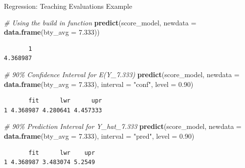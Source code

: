 \documentclass[
  ignorenonframetext,
]{beamer}
\newenvironment{Shaded}{\begin{snugshade}}{\end{snugshade}}
\newcommand{\AttributeTok}[1]{\textcolor[rgb]{0.13,0.29,0.53}{#1}}
\newcommand{\CommentTok}[1]{\textcolor[rgb]{0.56,0.35,0.01}{\textit{#1}}}
\newcommand{\FloatTok}[1]{\textcolor[rgb]{0.00,0.00,0.81}{#1}}
\newcommand{\FunctionTok}[1]{\textcolor[rgb]{0.13,0.29,0.53}{\textbf{#1}}}
\newcommand{\NormalTok}[1]{#1}
\newcommand{\StringTok}[1]{\textcolor[rgb]{0.31,0.60,0.02}{#1}}
\begin{document}
\begin{frame}[fragile]{Regression: Teaching Evaluations Example}
\label{regression-teaching-evaluations-example-17}
\normalsize

\begin{Shaded}
\begin{Highlighting}[]
\CommentTok{\# Using the build in function}
\FunctionTok{predict}\NormalTok{(score\_model, }\AttributeTok{newdata =} \FunctionTok{data.frame}\NormalTok{(}\AttributeTok{bty\_avg =} \FloatTok{7.333}\NormalTok{))}
\end{Highlighting}
\end{Shaded}

\begin{verbatim}
       1 
4.368987 
\end{verbatim}

\begin{Shaded}
\begin{Highlighting}[]
\CommentTok{\# 90\% Confidence Interval for E(Y\_7.333)}
\FunctionTok{predict}\NormalTok{(score\_model, }\AttributeTok{newdata =} \FunctionTok{data.frame}\NormalTok{(}\AttributeTok{bty\_avg =} \FloatTok{7.333}\NormalTok{), }
        \AttributeTok{interval =} \StringTok{"conf"}\NormalTok{, }\AttributeTok{level =} \FloatTok{0.90}\NormalTok{)}
\end{Highlighting}
\end{Shaded}

\begin{verbatim}
       fit      lwr      upr
1 4.368987 4.280641 4.457333
\end{verbatim}

\begin{Shaded}
\begin{Highlighting}[]
\CommentTok{\# 90\% Prediction Interval for Y\_hat\_7.333}
\FunctionTok{predict}\NormalTok{(score\_model, }\AttributeTok{newdata =} \FunctionTok{data.frame}\NormalTok{(}\AttributeTok{bty\_avg =} \FloatTok{7.333}\NormalTok{), }
        \AttributeTok{interval =} \StringTok{"pred"}\NormalTok{, }\AttributeTok{level =} \FloatTok{0.90}\NormalTok{)}
\end{Highlighting}
\end{Shaded}

\begin{verbatim}
       fit      lwr    upr
1 4.368987 3.483074 5.2549
\end{verbatim}

\normalsize
\end{frame}
\end{document}
